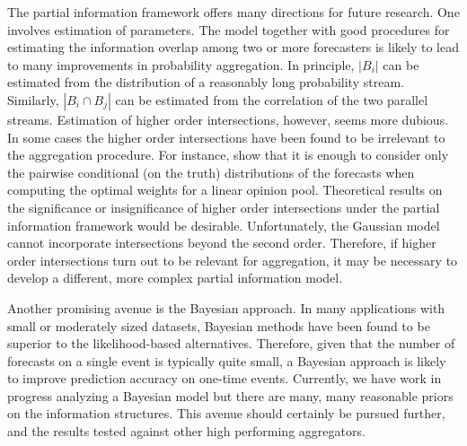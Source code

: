 \documentclass[12pt]{article}
\theoremstyle{definition}
\theoremstyle{definition}
\begin{document}
The partial information framework offers many directions for future research.  One involves estimation of parameters.  The model together with good procedures for estimating
the information overlap among two or more forecasters is likely to lead to many
improvements in probability aggregation. 
In principle, $|B_i|$ can be
estimated from the distribution of a reasonably long probability stream. Similarly, $|B_i \cap B_j|$ can be estimated from the correlation of the two parallel streams.  Estimation of higher order intersections, however, seems more
dubious. In some cases the higher order intersections have been found to be irrelevant to the aggregation procedure. For instance, \citet{degroot1991optimal} show that it is enough to consider only the pairwise conditional (on the truth) distributions of the forecasts when computing the optimal weights for a linear opinion pool. 
Theoretical results on the significance or insignificance
of higher order intersections under the partial information framework
would be desirable. Unfortunately, the Gaussian model cannot incorporate intersections beyond the second order. Therefore, if higher order intersections turn out to be relevant for aggregation, it may be necessary to develop a different, more complex partial information model. 

Another promising avenue is the Bayesian approach. In many applications with small or moderately sized datasets, Bayesian methods have been found to be superior to the likelihood-based alternatives. Therefore, given that the number of forecasts on a single event is typically quite small, a Bayesian approach is likely to improve prediction accuracy on one-time events. Currently, we have
work in progress analyzing a Bayesian model but there are many, many
reasonable priors on the information structures. 
 This avenue should
certainly be pursued further, and the results tested against other high
performing aggregators.





%
%
%

\end{document}

